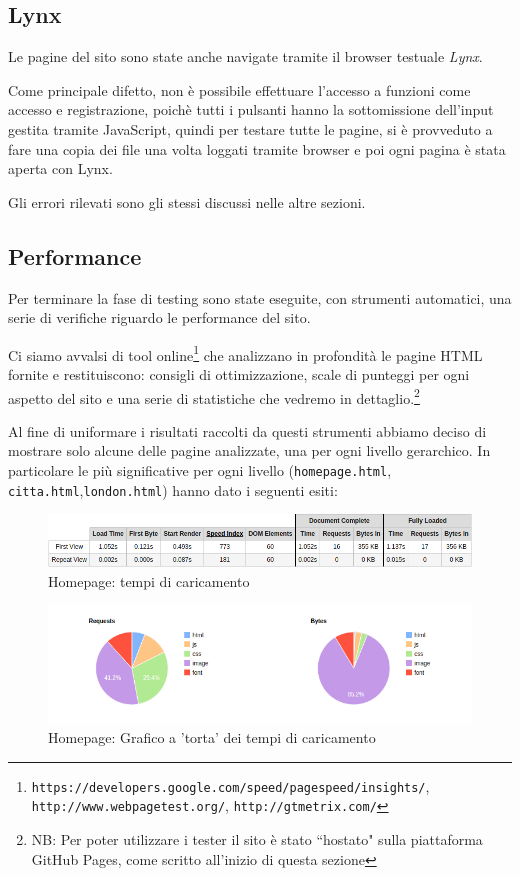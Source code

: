 \subsection{Lynx}\label{sec:lynx}
Le pagine del sito sono state anche navigate tramite il browser testuale
\textit{Lynx}.

Come principale difetto, non è possibile effettuare l'accesso a funzioni come
accesso e registrazione, poichè tutti i pulsanti hanno la sottomissione
dell'input gestita tramite JavaScript, quindi per testare tutte le pagine, si è
provveduto a fare una copia dei file una volta loggati tramite browser e poi
ogni pagina è stata aperta con Lynx.

Gli errori rilevati sono gli stessi discussi nelle altre sezioni.

\subsection{Performance}
Per terminare la fase di testing sono state eseguite, con strumenti
automatici, una serie di verifiche riguardo le performance del sito.

Ci siamo avvalsi di tool online\footnote{\texttt{https://developers.google.com/speed/pagespeed/insights/}, \texttt{http://www.webpagetest.org/},
\texttt{http://gtmetrix.com/}} che analizzano in profondità le pagine HTML
fornite e restituiscono: consigli di ottimizzazione, scale di punteggi per ogni
aspetto del sito e una serie di statistiche che vedremo in dettaglio.\footnote{NB: Per poter utilizzare i tester il sito è stato ``hostato" sulla piattaforma GitHub Pages, come scritto all'inizio di questa sezione}

Al fine di uniformare i risultati raccolti da questi strumenti abbiamo deciso
di mostrare solo alcune delle pagine analizzate, una per ogni livello
gerarchico.
In particolare le più significative per ogni livello (\texttt{homepage.html},
\texttt{citta.html},\texttt{london.html}) hanno dato i seguenti esiti:

\begin{figure}[h]
\includegraphics[width=\linewidth]{images/performance/webpagetest/home.png}
\caption{Homepage: tempi di caricamento}
\label{fig:tempiHome}
\end{figure}

\begin{figure}[h]
\includegraphics[width=\linewidth]{images/performance/webpagetest/home-graph.png}
\caption{Homepage: Grafico a 'torta' dei tempi di caricamento}
\end{figure}

